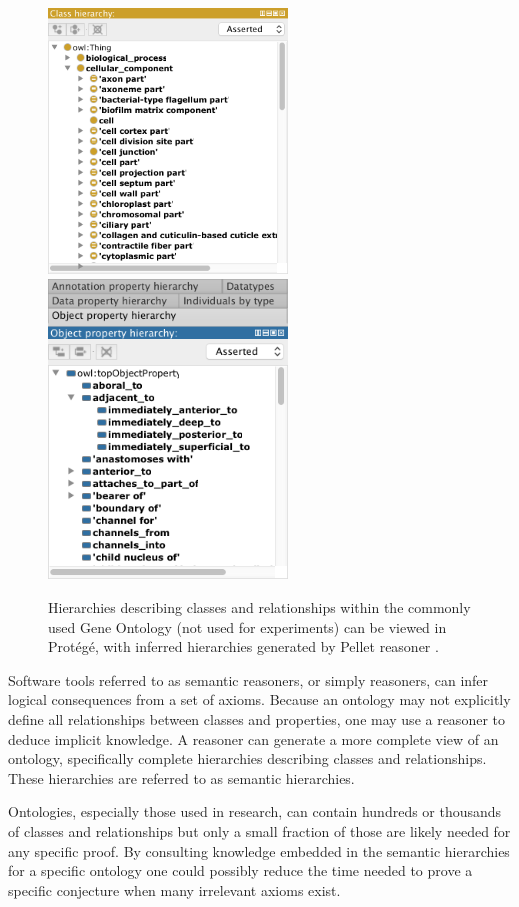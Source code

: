 \documentclass{article}
\begin{document}
\begin{figure}[h]
\centering
\includegraphics[width=2.5in]{class-hierarchy}
\includegraphics[width=2.5in]{object-property-hierarchy}
\caption{Hierarchies describing classes and relationships within the commonly used Gene Ontology (not used for experiments)  can be viewed in Prot{\'e}g{\'e}, with inferred hierarchies generated by Pellet reasoner \cite{gennari2003evolution}.}
\label{fig:class-hierarchy}
\end{figure}

Software tools referred to as semantic reasoners, or simply reasoners, can infer logical consequences from a set of axioms. Because an ontology may not explicitly define all relationships between classes and properties, one may use a reasoner to deduce implicit knowledge. A reasoner can generate a more complete view of an ontology, specifically complete hierarchies describing classes and relationships. These hierarchies are referred to as semantic hierarchies. 

Ontologies, especially those used in research, can contain hundreds or thousands of classes and relationships but only a small fraction of those are likely needed for any specific proof. By consulting knowledge embedded in the semantic hierarchies for a specific ontology one could possibly reduce the time needed to prove a specific conjecture when many irrelevant axioms exist. 
\end{document}
